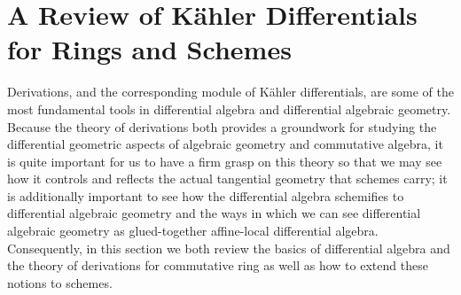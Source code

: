 \documentclass{amsart}
\theoremstyle{definition}
\numberwithin{equation}{subsection}
\begin{document}

\section{A Review of K{\"a}hler Differentials for Rings and Schemes}\label{Section: Diffles}

Derivations, and the corresponding module of K{\"a}hler differentials, are some of the most fundamental tools in differential algebra and differential algebraic geometry. Because the theory of derivations both provides a groundwork for studying the differential geometric aspects of algebraic geometry and commutative algebra, it is quite important for us to have a firm grasp on this theory so that we may see how it controls and reflects the actual tangential geometry that schemes carry; it is additionally important to see how the differential algebra schemifies to differential algebraic geometry and the ways in which we can see differential algebraic geometry as glued-together affine-local differential algebra. Consequently, in this section we both review the basics of differential algebra and the theory of derivations for commutative ring as well as how to extend these notions to schemes. 
\end{document}
